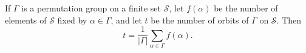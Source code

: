 If $\Gamma$ is a permutation group on a finite set $\mathcal{S}$, let $f(\alpha)$ be the number of elements of $\mathcal{S}$ fixed by $\alpha \in \Gamma$, and let $t$ be the number of orbits of $\Gamma$ on $\mathcal{S}$. Then
$$t = \frac{1}{|\Gamma|} \sum_{\alpha \in \Gamma} f(\alpha).$$
